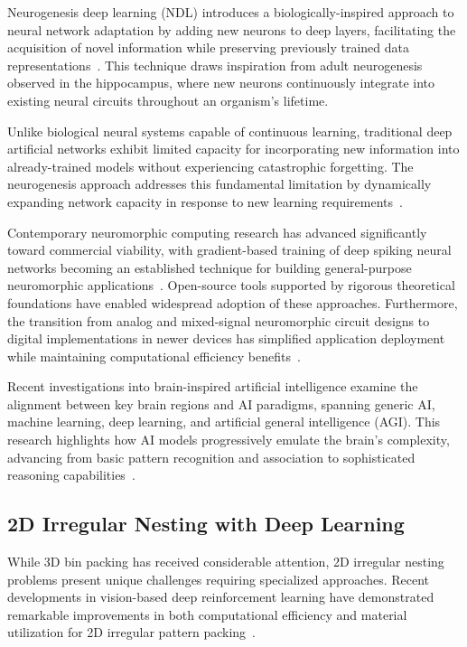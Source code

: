 \documentclass[12pt]{article}
\begin{document}
Neurogenesis deep learning (NDL) introduces a biologically-inspired approach to neural network adaptation by adding new neurons to deep layers, facilitating the acquisition of novel information while preserving previously trained data representations~\cite{neurogenesis_dl2017}. This technique draws inspiration from adult neurogenesis observed in the hippocampus, where new neurons continuously integrate into existing neural circuits throughout an organism's lifetime.

Unlike biological neural systems capable of continuous learning, traditional deep artificial networks exhibit limited capacity for incorporating new information into already-trained models without experiencing catastrophic forgetting. The neurogenesis approach addresses this fundamental limitation by dynamically expanding network capacity in response to new learning requirements~\cite{neurogenesis_dl2017}.

Contemporary neuromorphic computing research has advanced significantly toward commercial viability, with gradient-based training of deep spiking neural networks becoming an established technique for building general-purpose neuromorphic applications~\cite{neuromorphic2025}. Open-source tools supported by rigorous theoretical foundations have enabled widespread adoption of these approaches. Furthermore, the transition from analog and mixed-signal neuromorphic circuit designs to digital implementations in newer devices has simplified application deployment while maintaining computational efficiency benefits~\cite{neuromorphic_commercial2025}.

Recent investigations into brain-inspired artificial intelligence examine the alignment between key brain regions and AI paradigms, spanning generic AI, machine learning, deep learning, and artificial general intelligence (AGI). This research highlights how AI models progressively emulate the brain's complexity, advancing from basic pattern recognition and association to sophisticated reasoning capabilities~\cite{brain_inspired_ai2024}.

\subsection{2D Irregular Nesting with Deep Learning}

While 3D bin packing has received considerable attention, 2D irregular nesting problems present unique challenges requiring specialized approaches. Recent developments in vision-based deep reinforcement learning have demonstrated remarkable improvements in both computational efficiency and material utilization for 2D irregular pattern packing~\cite{nest_smarter2025}.
\end{document}
